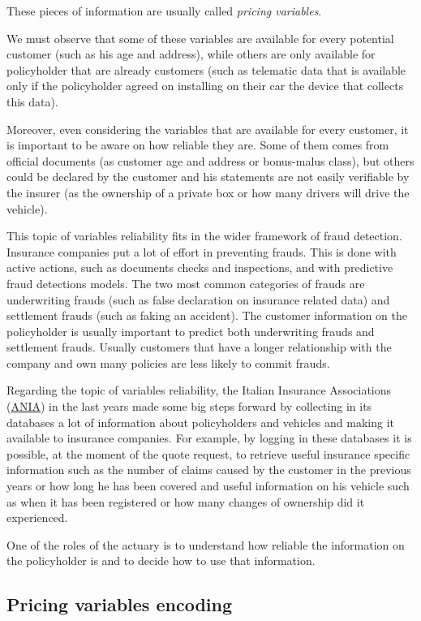 \documentclass[a4paper, nobind]{templates/ociamthesis}
\theoremstyle{definition}
\theoremstyle{definition}
\theoremstyle{definition}
\theoremstyle{remark}
\begin{document}
These pieces of information are usually called \emph{pricing variables}.

We must observe that some of these variables are available for every potential customer (such as his age and address), while others are only available for policyholder that are already customers (such as telematic data that is available only if the policyholder agreed on installing on their car the device that collects this data).

Moreover, even considering the variables that are available for every customer, it is important to be aware on how reliable they are. Some of them comes from official documents (as customer age and address or bonus-malus class), but others could be declared by the customer and his statements are not easily verifiable by the insurer (as the ownership of a private box or how many drivers will drive the vehicle).

This topic of variables reliability fits in the wider framework of fraud detection. Insurance companies put a lot of effort in preventing frauds. This is done with active actions, such as documents checks and inspections, and with predictive fraud detections models. The two most common categories of frauds are underwriting frauds (such as false declaration on insurance related data) and settlement frauds (such as faking an accident). The customer information on the policyholder is usually important to predict both underwriting frauds and settlement frauds. Usually customers that have a longer relationship with the company and own many policies are less likely to commit frauds.

Regarding the topic of variables reliability, the Italian Insurance Associations (\href{https://www.ania.it/}{ANIA}) in the last years made some big steps forward by collecting in its databases a lot of information about policyholders and vehicles and making it available to insurance companies. For example, by logging in these databases it is possible, at the moment of the quote request, to retrieve useful insurance specific information such as the number of claims caused by the customer in the previous years or how long he has been covered and useful information on his vehicle such as when it has been registered or how many changes of ownership did it experienced.

One of the roles of the actuary is to understand how reliable the information on the policyholder is and to decide how to use that information.

\hypertarget{chap:pricing-variables-encoding}{%
\subsection{Pricing variables encoding}\label{chap:pricing-variables-encoding}}
\end{document}
